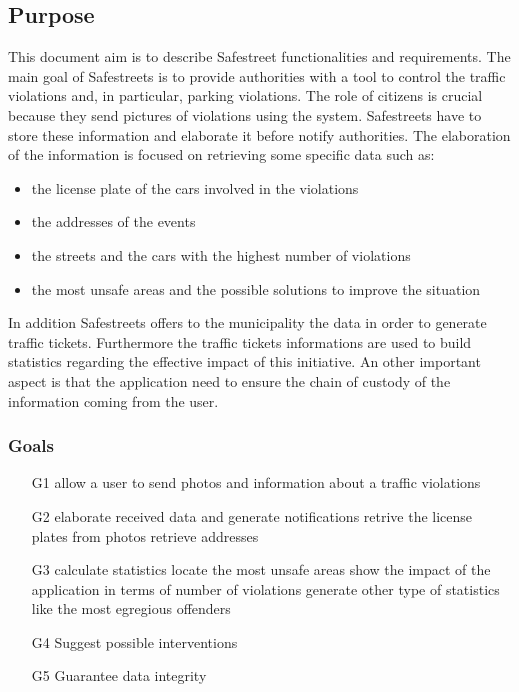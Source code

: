 \subsection{Purpose}
This document aim is to describe Safestreet functionalities and requirements.
The main goal of Safestreets is to provide authorities with a tool to control the traffic violations and, in particular, parking violations. The role of citizens is crucial because they send pictures of violations using the system. Safestreets have to store these information and elaborate it before notify authorities.
The elaboration of the information is focused on retrieving some specific data such as:
\begin{itemize}
	\item
	the license plate of the cars involved in the violations
	\item
	the addresses of the events
	\item 
	the streets and the cars with the highest number of violations
	\item 
	the most unsafe areas and the possible solutions to improve the situation
\end{itemize}
In addition Safestreets offers to the municipality the data in order to generate traffic tickets. Furthermore the traffic tickets informations are used to build statistics regarding the effective impact of this initiative.
An other important aspect is that the application need to ensure the chain of custody of the information coming from the user.
\subsubsection{Goals}
\begin{itemize}
	\item
	[G1] allow a user to send photos and information about a traffic violations
	\item 
	[G2] elaborate received data and generate notifications
		\subitem 
		[G2.1] retrive the license plates from photos
		\subitem
		[G2.2] retrieve addresses
	\item
	[G3] calculate statistics
		\subitem
		[G3.1] locate the most unsafe areas
		\subitem
		[G3.2] show the impact of the application in terms of number of violations
		\subitem
		[G3.3] generate other type of statistics like the most egregious offenders
	\item
	[G4] Suggest possible interventions
	\item
	[G5] Guarantee data integrity
		
\end{itemize}
